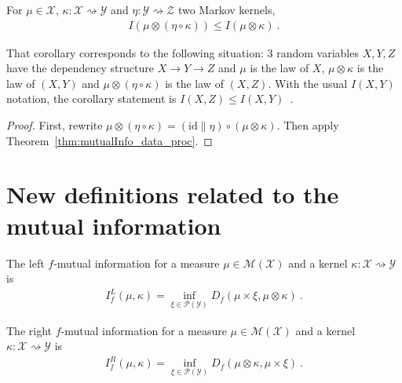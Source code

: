 \begin{corollary}
  \label{cor:mutualInfo_compProd_le}
  For $\mu \in \mathcal X$, $\kappa : \mathcal X \rightsquigarrow \mathcal Y$ and $\eta : \mathcal Y \rightsquigarrow \mathcal Z$ two Markov kernels,
  \begin{align*}
  I(\mu \otimes (\eta \circ \kappa)) \le I(\mu \otimes \kappa)
  \: .
  \end{align*}
\end{corollary}

That corollary corresponds to the following situation: 3 random variables $X, Y, Z$ have the dependency structure $X \to Y \to Z$ and $\mu$ is the law of $X$, $\mu \otimes \kappa$ is the law of $(X, Y)$ and $\mu \otimes (\eta \circ \kappa)$ is the law of $(X, Z)$.
With the usual $I(X, Y)$ notation, the corollary statement is $I(X, Z) \le I(X, Y)$~.

\begin{proof}%
{}
First, rewrite $\mu \otimes (\eta \circ \kappa) = (\mathrm{id} \parallel \eta) \circ (\mu \otimes \kappa)$. Then apply Theorem~\ref{thm:mutualInfo_data_proc}.
\end{proof}




\section{New definitions related to the mutual information}

\begin{definition}
  \label{def:fMutualInfoLeft}
  The left $f$-mutual information for a measure $\mu \in \mathcal M(\mathcal X)$ and a kernel $\kappa : \mathcal X \rightsquigarrow \mathcal Y$ is
  \begin{align*}
  I_f^L(\mu, \kappa) = \inf_{\xi \in \mathcal P(\mathcal Y)} D_f(\mu \times \xi, \mu \otimes \kappa) \: .
  \end{align*}
\end{definition}


\begin{definition}
  \label{def:fMutualInfoRight}
  The right $f$-mutual information for a measure $\mu \in \mathcal M(\mathcal X)$ and a kernel $\kappa : \mathcal X \rightsquigarrow \mathcal Y$ is
  \begin{align*}
  I_f^R(\mu, \kappa) = \inf_{\xi \in \mathcal P(\mathcal Y)} D_f(\mu \otimes \kappa, \mu \times \xi) \: .
  \end{align*}
\end{definition}


